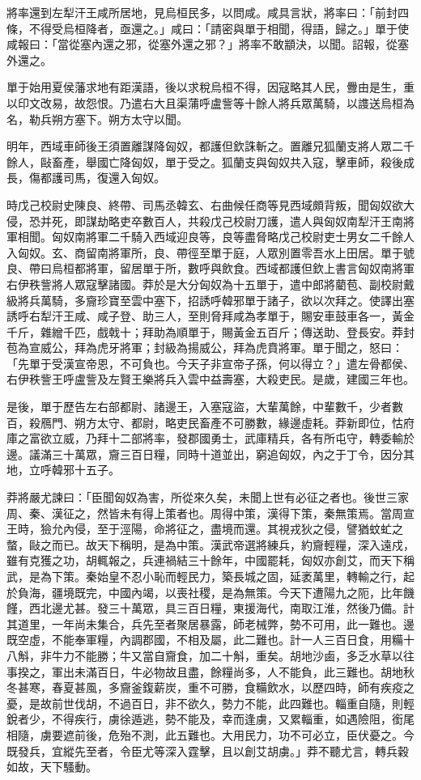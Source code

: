 \begin{pinyinscope}
將率還到左犁汗王咸所居地，見烏桓民多，以問咸。咸具言狀，將率曰：「前封四條，不得受烏桓降者，亟還之。」咸曰：「請密與單于相聞，得語，歸之。」單于使咸報曰：「當從塞內還之邪，從塞外還之邪？」將率不敢顓決，以聞。詔報，從塞外還之。

單于始用夏侯藩求地有距漢語，後以求稅烏桓不得，因寇略其人民，釁由是生，重以印文改易，故怨恨。乃遣右大且渠蒲呼盧訾等十餘人將兵眾萬騎，以謢送烏桓為名，勒兵朔方塞下。朔方太守以聞。

明年，西域車師後王須置離謀降匈奴，都護但欽誅斬之。置離兄狐蘭支將人眾二千餘人，敺畜產，舉國亡降匈奴，單于受之。狐蘭支與匈奴共入寇，擊車師，殺後成長，傷都護司馬，復還入匈奴。

時戊己校尉史陳良、終帶、司馬丞韓玄、右曲候任商等見西域頗背叛，聞匈奴欲大侵，恐并死，即謀劫略吏卒數百人，共殺戊己校尉刀護，遣人與匈奴南犁汗王南將軍相聞。匈奴南將軍二千騎入西域迎良等，良等盡脅略戊己校尉吏士男女二千餘人入匈奴。玄、商留南將軍所，良、帶徑至單于庭，人眾別置零吾水上田居。單于號良、帶曰烏桓都將軍，留居單于所，數呼與飲食。西域都護但欽上書言匈奴南將軍右伊秩訾將人眾寇擊諸國。莽於是大分匈奴為十五單于，遣中郎將藺苞、副校尉戴級將兵萬騎，多齎珍寶至雲中塞下，招誘呼韓邪單于諸子，欲以次拜之。使譯出塞誘呼右犁汗王咸、咸子登、助三人，至則脅拜咸為孝單于，賜安車鼓車各一，黃金千斤，雜繒千匹，戲戟十；拜助為順單于，賜黃金五百斤；傳送助、登長安。莽封苞為宣威公，拜為虎牙將軍；封級為揚威公，拜為虎賁將軍。單于聞之，怒曰：「先單于受漢宣帝恩，不可負也。今天子非宣帝子孫，何以得立？」遣左骨都侯、右伊秩訾王呼盧訾及左賢王樂將兵入雲中益壽塞，大殺吏民。是歲，建國三年也。

是後，單于歷告左右部都尉、諸邊王，入塞寇盜，大輩萬餘，中輩數千，少者數百，殺鴈門、朔方太守、都尉，略吏民畜產不可勝數，緣邊虛耗。莽新即位，怙府庫之富欲立威，乃拜十二部將率，發郡國勇士，武庫精兵，各有所屯守，轉委輸於邊。議滿三十萬眾，齎三百日糧，同時十道並出，窮追匈奴，內之于丁令，因分其地，立呼韓邪十五子。

莽將嚴尤諫曰：「臣聞匈奴為害，所從來久矣，未聞上世有必征之者也。後世三家周、秦、漢征之，然皆未有得上策者也。周得中策，漢得下策，秦無策焉。當周宣王時，獫允內侵，至于涇陽，命將征之，盡境而還。其視戎狄之侵，譬猶蚊虻之螫，敺之而已。故天下稱明，是為中策。漢武帝選將練兵，約齎輕糧，深入遠戍，雖有克獲之功，胡輒報之，兵連禍結三十餘年，中國罷耗，匈奴亦創艾，而天下稱武，是為下策。秦始皇不忍小恥而輕民力，築長城之固，延袤萬里，轉輸之行，起於負海，疆境既完，中國內竭，以喪社稷，是為無策。今天下遭陽九之阨，比年饑饉，西北邊尤甚。發三十萬眾，具三百日糧，東援海代，南取江淮，然後乃備。計其道里，一年尚未集合，兵先至者聚居暴露，師老械弊，勢不可用，此一難也。邊既空虛，不能奉軍糧，內調郡國，不相及屬，此二難也。計一人三百日食，用糒十八斛，非牛力不能勝；牛又當自齎食，加二十斛，重矣。胡地沙鹵，多乏水草以往事揆之，軍出未滿百日，牛必物故且盡，餘糧尚多，人不能負，此三難也。胡地秋冬甚寒，春夏甚風，多齎釜鍑薪炭，重不可勝，食糒飲水，以歷四時，師有疾疫之憂，是故前世伐胡，不過百日，非不欲久，勢力不能，此四難也。輜重自隨，則輕銳者少，不得疾行，虜徐遁逃，勢不能及，幸而逢虜，又累輜重，如遇險阻，銜尾相隨，虜要遮前後，危殆不測，此五難也。大用民力，功不可必立，臣伏憂之。今既發兵，宜縱先至者，令臣尤等深入霆擊，且以創艾胡虜。」莽不聽尤言，轉兵穀如故，天下騷動。


\end{pinyinscope}
